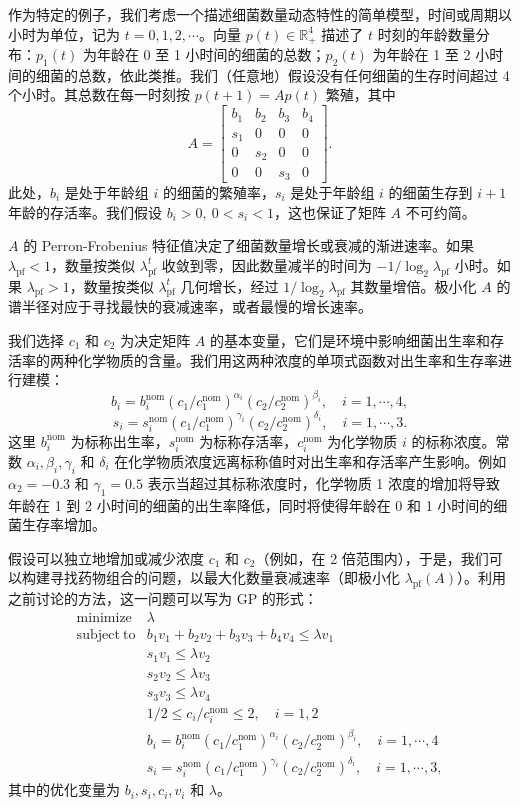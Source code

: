 \documentclass[UTF8,12pt,a4paper,fontset=fandol]{ctexart}
\begin{document}
作为特定的例子，我们考虑一个描述细菌数量动态特性的简单模型，时间或周期以小时为单位，记为 $t=0,1,2,\cdots$。向量 $p(t)\in\mathbb{R}_+^4$ 描述了 $t$ 时刻的年龄数量分布：$p_1(t)$ 为年龄在 0 至 1 小时间的细菌的总数；$p_2(t)$ 为年龄在 1 至 2 小时间的细菌的总数，依此类推。我们（任意地）假设没有任何细菌的生存时间超过 4 个小时。其总数在每一时刻按 $p(t+1)=Ap(t)$ 繁殖，其中
\[
A=
\begin{bmatrix}
b_1 & b_2 & b_3 & b_4\\
s_1 & 0 & 0 & 0\\
0 & s_2 & 0 & 0\\
0 & 0 & s_3 & 0
\end{bmatrix}.
\]
此处，$b_i$ 是处于年龄组 $i$ 的细菌的繁殖率，$s_i$ 是处于年龄组 $i$ 的细菌生存到 $i+1$ 年龄的存活率。我们假设 $b_i>0,\ 0<s_i<1$，这也保证了矩阵 $A$ 不可约简。

$A$ 的 Perron-Frobenius 特征值决定了细菌数量增长或衰减的渐进速率。如果 $\lambda_{\mathrm{pf}}<1$，数量按类似 $\lambda_{\mathrm{pf}}^t$ 收敛到零，因此数量减半的时间为 $-1/\log_2\lambda_{\mathrm{pf}}$ 小时。如果 $\lambda_{\mathrm{pf}}>1$，数量按类似 $\lambda_{\mathrm{pf}}^t$ 几何增长，经过 $1/\log_2\lambda_{\mathrm{pf}}$ 其数量增倍。极小化 $A$ 的谱半径对应于寻找最快的衰减速率，或者最慢的增长速率。

我们选择 $c_1$ 和 $c_2$ 为决定矩阵 $A$ 的基本变量，它们是环境中影响细菌出生率和存活率的两种化学物质的含量。我们用这两种浓度的单项式函数对出生率和生存率进行建模：
\[
b_i=b_i^{\mathrm{nom}}(c_1/c_1^{\mathrm{nom}})^{\alpha_i}(c_2/c_2^{\mathrm{nom}})^{\beta_i},\quad i=1,\cdots,4,
\]
\[
s_i=s_i^{\mathrm{nom}}(c_1/c_1^{\mathrm{nom}})^{\gamma_i}(c_2/c_2^{\mathrm{nom}})^{\delta_i},\quad i=1,\cdots,3.
\]
这里 $b_i^{\mathrm{nom}}$ 为标称出生率，$s_i^{\mathrm{nom}}$ 为标称存活率，$c_i^{\mathrm{nom}}$ 为化学物质 $i$ 的标称浓度。常数 $\alpha_i,\beta_i,\gamma_i$ 和 $\delta_i$ 在化学物质浓度远离标称值时对出生率和存活率产生影响。例如 $\alpha_2=-0.3$ 和 $\gamma_1=0.5$ 表示当超过其标称浓度时，化学物质 1 浓度的增加将导致年龄在 1 到 2 小时间的细菌的出生率降低，同时将使得年龄在 0 和 1 小时间的细菌生存率增加。

假设可以独立地增加或减少浓度 $c_1$ 和 $c_2$（例如，在 2 倍范围内），于是，我们可以构建寻找药物组合的问题，以最大化数量衰减速率（即极小化 $\lambda_{\mathrm{pf}}(A)$）。利用之前讨论的方法，这一问题可以写为 GP 的形式：
\[
\begin{array}{ll}
\mathop{\mathrm{minimize}} & \lambda\\
\mathrm{subject\ to} & b_1v_1+b_2v_2+b_3v_3+b_4v_4\leq \lambda v_1\\
& s_1v_1\leq \lambda v_2\\
& s_2v_2\leq \lambda v_3\\
& s_3v_3\leq \lambda v_4\\
& 1/2\leq c_i/c_i^{\mathrm{nom}}\leq 2,\quad i=1,2\\
& b_i=b_i^{\mathrm{nom}}(c_1/c_1^{\mathrm{nom}})^{\alpha_i}(c_2/c_2^{\mathrm{nom}})^{\beta_i},\quad i=1,\cdots,4\\
& s_i=s_i^{\mathrm{nom}}(c_1/c_1^{\mathrm{nom}})^{\gamma_i}(c_2/c_2^{\mathrm{nom}})^{\delta_i},\quad i=1,\cdots,3,
\end{array}
\]
其中的优化变量为 $b_i,s_i,c_i,v_i$ 和 $\lambda$。
\end{document}
